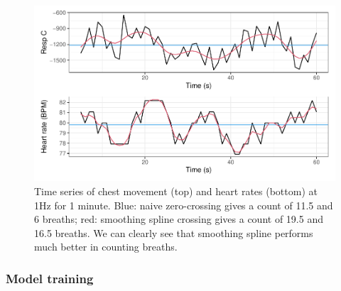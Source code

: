 \documentclass[
]{article}
\begin{document}
\begin{figure}

{\centering \includegraphics{report_files/figure-latex/sszc-1} 

}

\caption{Time series of chest movement (top) and heart rates (bottom) at 1Hz for 1 minute. Blue: naive zero-crossing gives a count of 11.5 and 6 breaths; red: smoothing spline crossing gives a count of 19.5 and 16.5 breaths. We can clearly see that smoothing spline performs much better in counting breaths.}\label{fig:sszc}
\end{figure}

\hypertarget{model-training}{%
\subsubsection{Model training}\label{model-training}}
\end{document}

